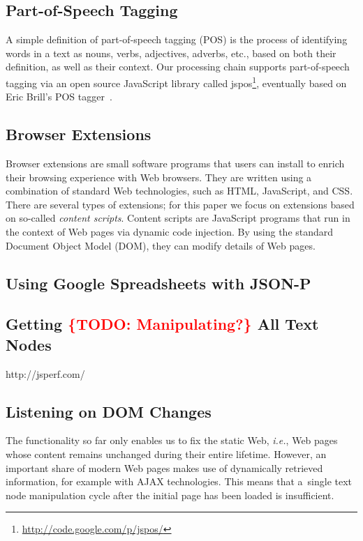 \documentclass{acm_proc_article-sp}
\let\oldemph\emph
\renewcommand{\emph}[1]{\oldemph{\fontsize{9}{9}\selectfont #1}}
\newcommand{\todo}[1]{\noindent\textcolor{red}{{\bf \{TODO}: #1{\bf \}}}}
\newcommand{\inlinelistingsize}{\fontsize{8pt}{11pt}}
\let\oldurl\url
\renewcommand{\url}[1]{\inlinelistingsize\oldurl{#1}}
\begin{document}
\subsection{Part-of-Speech Tagging}
A simple definition of part-of-speech tagging (POS) is the process of identifying words in a text as nouns, verbs, adjectives, adverbs, etc., based on both their definition, as well as their context.
Our processing chain supports part-of-speech tagging via an open source JavaScript library called jspos\footnote{\url{http://code.google.com/p/jspos/}},
eventually based on Eric Brill's POS tagger~\cite{brill1992simple}.

\subsection{Browser Extensions}
Browser extensions are small software programs that users can install to enrich their browsing experience with Web browsers.
They are written using a combination of standard Web technologies, such as HTML, JavaScript, and CSS.
There are several types of extensions; for this paper we focus on extensions based on so-called \emph{content scripts}.
Content scripts are JavaScript programs that run in the context of Web pages via dynamic code injection.
By using the standard Document Object Model (DOM), they can modify details of Web pages.

\subsection{Using Google Spreadsheets with JSON-P}
\cite{jsonp2009}

\subsection{Getting \todo{Manipulating?} All Text Nodes}
\label{subsec:textnodes}
http://jsperf.com/

\subsection{Listening on DOM Changes}
The functionality so far only enables us to fix the static Web, \emph{i.e.}, Web pages whose content remains unchanged during their entire lifetime.
However, an important share of modern Web pages makes use of dynamically retrieved information, for example with AJAX technologies.
This means that a~single text node manipulation cycle after the initial page has been loaded is insufficient.
\end{document}
